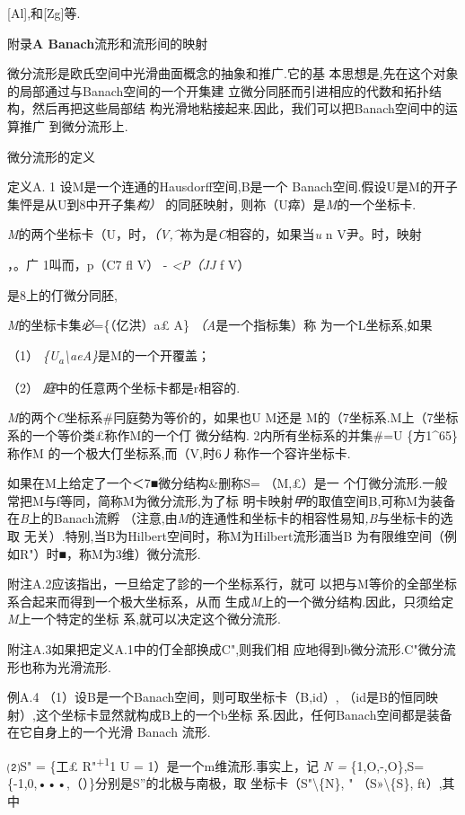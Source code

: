 {[}Al{]},和{[}Zg{]}等.

附录\textbf{A Banach}流形和流形间的映射

微分流形是欧氏空间中光滑曲面概念的抽象和推广.它的基
本思想是,先在这个对象的局部通过与Banach空间的一个开集建
立微分同胚而引进相应的代数和拓扑结构，然后再把这些局部结
构光滑地粘接起来.因此，我们可以把Banach空间中的运算推广 到微分流形上.

微分流形的定义

定义A. 1 设M是一个连通的Hausdorff空间,B是一个
Banach空间.假设U是M的开子集怦是从U到8中开子集\emph{构）}
的同胚映射，则祢（U瘁）是\emph{M}的一个坐标卡.

\emph{M}的两个坐标卡（U，时，\emph{（V,\^{}}祢为是\emph{C}相容的，如果当\emph{u}
n V尹。时，映射

，。广 1叫而，p（C7 fl V） - \emph{\textless{}P（JJ} f\textbar{} V）

是8上的仃微分同胚,

\emph{M}的坐标卡集\emph{必}=\{（亿洪）\textbar{}a£ A\}
\emph{（A}是一个指标集）称 为一个L坐标系,如果

（1） \emph{\{U\textsubscript{a}\textbackslash{}aeA\}}是M的一个开覆盖；

（2） \emph{庭}中的任意两个坐标卡都是r相容的.

\emph{M}的两个\emph{C}坐标系\#冃庭勢为等价的，如果也U M还是
M的（7坐标系.M上（7坐标系的一个等价类£称作M的一个仃 微分结构.
2内所有坐标系的并集\#=U \{方1\^{}65\}称作M
的一个极大仃坐标系,而（V,时6丿称作一个容许坐标卡.

如果在M上给定了一个＜7■微分结构\&删称S= （M,£）是一
个仃微分流形.一般常把M与f等同，简称M为微分流形,为了标
明卡映射\emph{甲}的取值空间B,可称M为装备在\emph{B}上的Banach流孵
（注意,由\emph{M}的连通性和坐标卡的相容性易知\emph{,B}与坐标卡的选取
无关）.特别,当B为Hilbert空间时，称M为Hilbert流形湎当B
为有限维空间（例如R"）时■，称M为3维）微分流形.

附注A.2应该指出，一旦给定了診的一个坐标系行，就可
以把与M等价的全部坐标系合起来而得到一个极大坐标系，从而
生成\emph{M}上的一个微分结构.因此，只须给定\emph{M}上一个特定的坐标
系,就可以决定这个微分流形.

附注A.3如果把定义A.1中的仃全部换成C",则我们相
应地得到b微分流形.C"微分流形也称为光滑流形.

例A.4 （1）设B是一个Banach空间，则可取坐标卡（B,id）,
（id是B的恒同映射）,这个坐标卡显然就构成B上的一个b坐标
系.因此，任何Banach空间都是装备在它自身上的一个光滑 Banach 流形.

⑵S" = \{工£ R"\textsuperscript{+1}1 U\textbar{}\textbar{} =
1）是一个m维流形.事实上，记 \emph{N =} \{1,O,-,O\},S=
\{-1,0,•••,（）\}分别是S''的北极与南极，取
坐标卡（S"\textbackslash{}\{N\}, " （S»\textbackslash{}\{S\}, ft）,其中


